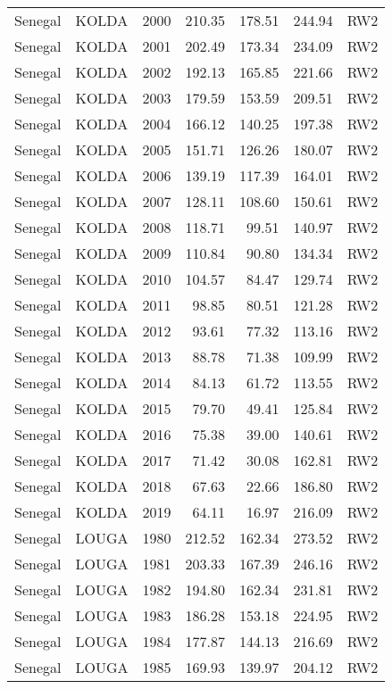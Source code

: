\begin{longtable}{lllrrrl}
  Senegal & KOLDA & 2000 & 210.35 & 178.51 & 244.94 & RW2 \\ 
  Senegal & KOLDA & 2001 & 202.49 & 173.34 & 234.09 & RW2 \\ 
  Senegal & KOLDA & 2002 & 192.13 & 165.85 & 221.66 & RW2 \\ 
  Senegal & KOLDA & 2003 & 179.59 & 153.59 & 209.51 & RW2 \\ 
  Senegal & KOLDA & 2004 & 166.12 & 140.25 & 197.38 & RW2 \\ 
  Senegal & KOLDA & 2005 & 151.71 & 126.26 & 180.07 & RW2 \\ 
  Senegal & KOLDA & 2006 & 139.19 & 117.39 & 164.01 & RW2 \\ 
  Senegal & KOLDA & 2007 & 128.11 & 108.60 & 150.61 & RW2 \\ 
  Senegal & KOLDA & 2008 & 118.71 & 99.51 & 140.97 & RW2 \\ 
  Senegal & KOLDA & 2009 & 110.84 & 90.80 & 134.34 & RW2 \\ 
  Senegal & KOLDA & 2010 & 104.57 & 84.47 & 129.74 & RW2 \\ 
  Senegal & KOLDA & 2011 & 98.85 & 80.51 & 121.28 & RW2 \\ 
  Senegal & KOLDA & 2012 & 93.61 & 77.32 & 113.16 & RW2 \\ 
  Senegal & KOLDA & 2013 & 88.78 & 71.38 & 109.99 & RW2 \\ 
  Senegal & KOLDA & 2014 & 84.13 & 61.72 & 113.55 & RW2 \\ 
  Senegal & KOLDA & 2015 & 79.70 & 49.41 & 125.84 & RW2 \\ 
  Senegal & KOLDA & 2016 & 75.38 & 39.00 & 140.61 & RW2 \\ 
  Senegal & KOLDA & 2017 & 71.42 & 30.08 & 162.81 & RW2 \\ 
  Senegal & KOLDA & 2018 & 67.63 & 22.66 & 186.80 & RW2 \\ 
  Senegal & KOLDA & 2019 & 64.11 & 16.97 & 216.09 & RW2 \\ 
  Senegal & LOUGA & 1980 & 212.52 & 162.34 & 273.52 & RW2 \\ 
  Senegal & LOUGA & 1981 & 203.33 & 167.39 & 246.16 & RW2 \\ 
  Senegal & LOUGA & 1982 & 194.80 & 162.34 & 231.81 & RW2 \\ 
  Senegal & LOUGA & 1983 & 186.28 & 153.18 & 224.95 & RW2 \\ 
  Senegal & LOUGA & 1984 & 177.87 & 144.13 & 216.69 & RW2 \\ 
  Senegal & LOUGA & 1985 & 169.93 & 139.97 & 204.12 & RW2 \\ 

\end{longtable}

